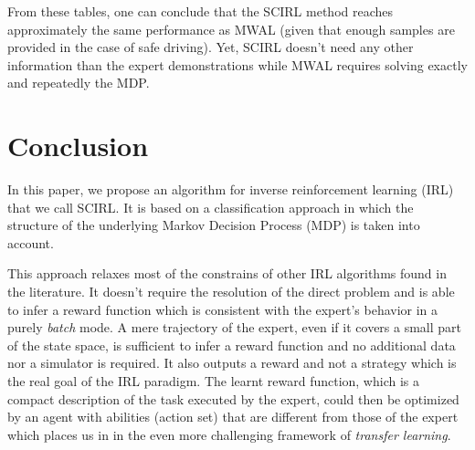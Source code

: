 \documentclass{article}
\begin{document}
From these tables, one can conclude that the SCIRL method reaches
approximately the same performance as MWAL (given that enough
samples are provided in the case of safe driving). Yet, SCIRL
doesn't need any other information than the expert demonstrations
while MWAL requires solving exactly and repeatedly the MDP.

\section{Conclusion}

In this paper, we propose an algorithm for inverse reinforcement
learning (IRL) that we call SCIRL. It is based on a classification
approach in which the structure of the underlying Markov Decision
Process (MDP) is taken into account.

This approach relaxes most of the constrains of other IRL algorithms
found in the literature. It doesn't require the resolution of the
direct problem and is able to infer a reward function which is
consistent with the expert's behavior in a purely \emph{batch} mode.
%
%
A mere trajectory of the expert, even if it covers a small part of
the state space, is sufficient to infer a reward function and no
additional data nor a simulator is required. It also outputs a
reward and not a strategy which is the real goal of the IRL
paradigm. The learnt reward function, which is a compact description
of the task executed by the expert, could then be optimized by an
agent with abilities (action set) that are different from those of
the expert which places us in in the even more challenging framework
of \emph{transfer learning}.
%
\end{document}
